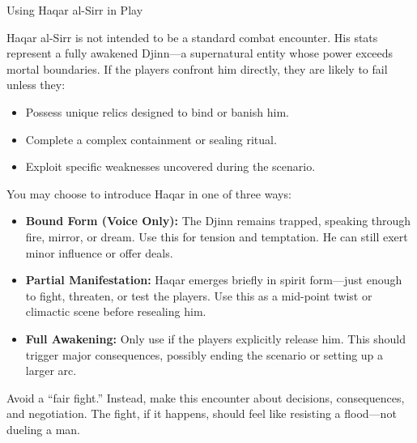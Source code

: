 \begin{CommentBox}{Using Haqar al-Sirr in Play}

    Haqar al-Sirr is not intended to be a standard combat encounter. His stats represent a fully awakened Djinn—a supernatural entity whose power exceeds mortal boundaries. If the players confront him directly, they are likely to fail unless they:
    
    \begin{itemize}
        \item Possess unique relics designed to bind or banish him.
        \item Complete a complex containment or sealing ritual.
        \item Exploit specific weaknesses uncovered during the scenario.
    \end{itemize}
    
    You may choose to introduce Haqar in one of three ways:
    
    \begin{itemize}
        \item \textbf{Bound Form (Voice Only):} The Djinn remains trapped, speaking through fire, mirror, or dream. Use this for tension and temptation. He can still exert minor influence or offer deals.
        
        \item \textbf{Partial Manifestation:} Haqar emerges briefly in spirit form—just enough to fight, threaten, or test the players. Use this as a mid-point twist or climactic scene before resealing him.
    
        \item \textbf{Full Awakening:} Only use if the players explicitly release him. This should trigger major consequences, possibly ending the scenario or setting up a larger arc.
    \end{itemize}
    
    Avoid a “fair fight.” Instead, make this encounter about decisions, consequences, and negotiation. The fight, if it happens, should feel like resisting a flood—not dueling a man.
    
\end{CommentBox}

